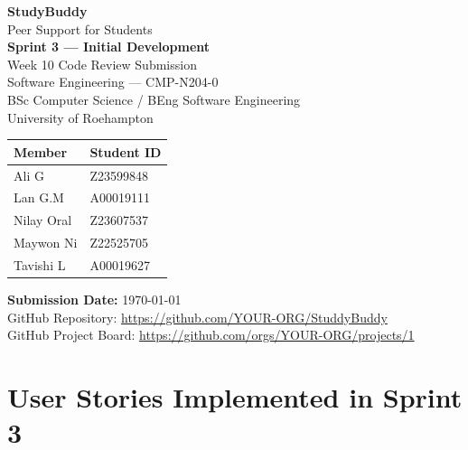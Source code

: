 \documentclass[11pt,a4paper]{article}
\begin{document}
\begin{titlepage}
    \centering
    \vspace*{2cm}

    {\Huge\bfseries\textcolor{roehampton}{StudyBuddy}}\\[0.5cm]
    {\Large\textcolor{accent}{Peer Support for Students}}\\[1cm]
    {\LARGE\bfseries Sprint 3 — Initial Development}\\[0.3cm]
    {\large Week 10 Code Review Submission}\\[2cm]

    {\large Software Engineering — CMP-N204-0}\\[0.3cm]
    {\large BSc Computer Science / BEng Software Engineering}\\[0.3cm]
    {\large University of Roehampton}\\[2cm]

    \begin{tabular}{ll}
        \toprule
        \textbf{Member} & \textbf{Student ID} \\
        \midrule
        Ali G       & Z23599848 \\
        Lan G.M     & A00019111 \\
        Nilay Oral  & Z23607537 \\
        Maywon Ni   & Z22525705 \\
        Tavishi L   & A00019627 \\
        \bottomrule
    \end{tabular}

    \vfill

    {\large\textbf{Submission Date:} \today}\\[0.3cm]
    {\normalsize GitHub Repository: \url{https://github.com/YOUR-ORG/StuddyBuddy}}\\[0.2cm]
    {\normalsize GitHub Project Board: \url{https://github.com/orgs/YOUR-ORG/projects/1}}

\end{titlepage}

\tableofcontents
\newpage

\section{User Stories Implemented in Sprint 3}
\end{document}
